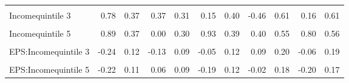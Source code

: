 \begin{table}
\begin{tabular}[t]{lrrrrrrrrrr}
\cellcolor{gray!10}{Incomequintile 2} & \cellcolor{gray!10}{0.08} & \cellcolor{gray!10}{0.38} & \cellcolor{gray!10}{-0.08} & \cellcolor{gray!10}{0.30} & \cellcolor{gray!10}{0.33} & \cellcolor{gray!10}{0.41} & \cellcolor{gray!10}{-0.46} & \cellcolor{gray!10}{0.61} & \cellcolor{gray!10}{-0.07} & \cellcolor{gray!10}{0.63}\\
Incomequintile 3 & 0.78 & 0.37 & 0.37 & 0.31 & 0.15 & 0.40 & -0.46 & 0.61 & 0.16 & 0.61\\
\cellcolor{gray!10}{Incomequintile 4} & \cellcolor{gray!10}{0.89} & \cellcolor{gray!10}{0.36} & \cellcolor{gray!10}{0.51} & \cellcolor{gray!10}{0.31} & \cellcolor{gray!10}{0.39} & \cellcolor{gray!10}{0.39} & \cellcolor{gray!10}{-0.30} & \cellcolor{gray!10}{0.58} & \cellcolor{gray!10}{-0.04} & \cellcolor{gray!10}{0.63}\\
Incomequintile 5 & 0.89 & 0.37 & 0.00 & 0.30 & 0.93 & 0.39 & 0.40 & 0.55 & 0.80 & 0.56\\
\cellcolor{gray!10}{EPS:Incomequintile 2} & \cellcolor{gray!10}{-0.03} & \cellcolor{gray!10}{0.12} & \cellcolor{gray!10}{0.03} & \cellcolor{gray!10}{0.09} & \cellcolor{gray!10}{-0.11} & \cellcolor{gray!10}{0.13} & \cellcolor{gray!10}{0.12} & \cellcolor{gray!10}{0.19} & \cellcolor{gray!10}{0.02} & \cellcolor{gray!10}{0.19}\\
EPS:Incomequintile 3 & -0.24 & 0.12 & -0.13 & 0.09 & -0.05 & 0.12 & 0.09 & 0.20 & -0.06 & 0.19\\
\cellcolor{gray!10}{EPS:Incomequintile 4} & \cellcolor{gray!10}{-0.24} & \cellcolor{gray!10}{0.11} & \cellcolor{gray!10}{-0.11} & \cellcolor{gray!10}{0.09} & \cellcolor{gray!10}{-0.05} & \cellcolor{gray!10}{0.12} & \cellcolor{gray!10}{0.18} & \cellcolor{gray!10}{0.18} & \cellcolor{gray!10}{0.03} & \cellcolor{gray!10}{0.19}\\
EPS:Incomequintile 5 & -0.22 & 0.11 & 0.06 & 0.09 & -0.19 & 0.12 & -0.02 & 0.18 & -0.20 & 0.17\\
\bottomrule
\end{tabular}
\end{table}
